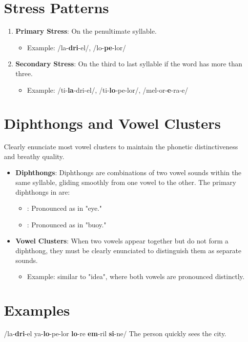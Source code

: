 \section*{Stress Patterns}
\begin{enumerate}
    \item \textbf{Primary Stress}: On the penultimate syllable.
    \begin{itemize}
        \item Example: /la-\textbf{dri}-el/, /lo-\textbf{pe}-lor/
    \end{itemize}
    \item \textbf{Secondary Stress}: On the third to last syllable if the word has more than three.
    \begin{itemize}
        \item Example: /ti-\textbf{la}-dri-el/, /ti-\textbf{lo}-pe-lor/, /mel-or-\textbf{e}-ra-e/
    \end{itemize}
\end{enumerate}

\section*{Diphthongs and Vowel Clusters}
Clearly enunciate most vowel clusters to maintain the phonetic distinctiveness and breathy quality.
\begin{itemize}
\item \textbf{Diphthongs}: Diphthongs are combinations of two vowel sounds within the same syllable, gliding smoothly from one vowel to the other. The primary diphthongs in are:
\begin{itemize}
\item {}: Pronounced as in "eye."
\item {}: Pronounced as in "buoy."
\end{itemize}
\item \textbf{Vowel Clusters}: When two vowels appear together but do not form a diphthong, they must be clearly enunciated to distinguish them as separate sounds.
\begin{itemize}
\item Example:  similar to "idea", where both vowels are pronounced distinctly.
\end{itemize}
\end{itemize}

\section*{Examples}
\begin{description}
        \item /la-\textbf{dri}-el ya-\textbf{lo}-pe-lor \textbf{lo}-re \textbf{em}-ril \textbf{si}-ne\textesh/ 
        \hanging The person quickly sees the city.
\end{description}



